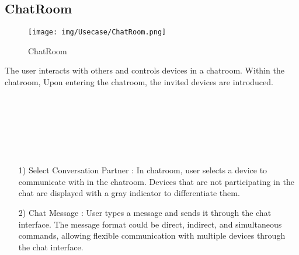 \documentclass[conference]{IEEEtran}
\begin{document}
\subsection{ChatRoom}
\begin{figure}[h]
\hspace{1.5cm}
\centering
\begin{minipage}{0.4\columnwidth}
    \texttt{[image: img/Usecase/ChatRoom.png]}
    \caption{ChatRoom}
\end{minipage}
\end{figure}
The user interacts with others and controls devices in a chatroom. Within the chatroom, Upon entering the chatroom, the invited devices are introduced. \\ \\ \\ \\ \\ \\ \\

\begin{enumerate}
\begin{figure}[h]
\hspace{1.5cm}
\centering
\begin{minipage}{0.4\columnwidth}
    \texttt{[image: img/Usecase/Select Conversation Partner.png]}
    \caption{Select Conversation Partner}
\end{minipage}
\end{figure}
    \item [1)] Select Conversation Partner : 
    In chatroom, user selects a device to communicate with in the chatroom. Devices that are not participating in the chat are displayed with a gray indicator to differentiate them. \\
\end{enumerate}

\begin{enumerate}
    \begin{figure}[h]
\hspace{1.5cm}
\centering
\begin{minipage}{0.4\columnwidth}
    \texttt{[image: img/Usecase/Chat Message.png]}
    \caption{\\ Chat Message}
\end{minipage}
\end{figure}
    \item [2)] Chat Message : User types a message and sends it through the chat interface. The message format could be direct, indirect, and simultaneous commands, allowing flexible communication with multiple devices through the chat interface. \\ \\ \\
\end{enumerate}
\end{document}

